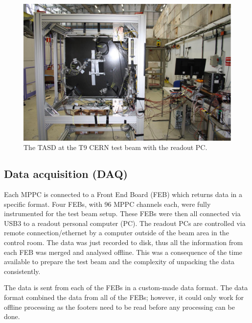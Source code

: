 \begin{figure}[h!]
\centering
\includegraphics[width=\textwidth]{figures/TASDinstrumented.jpeg}
\caption{The TASD at the T9 CERN test beam with the readout PC.}
\label{fig:TASDreal}
\end{figure}

\subsection{Data acquisition (DAQ)}
Each MPPC is connected to a Front End Board (FEB) which returns data in a specific format. Four FEBs, with 96 MPPC channels each, were fully instrumented for the test beam setup. These FEBs were then all connected via USB3 to a readout personal computer (PC). The readout PCs are controlled via remote connection/ethernet by a computer outside of the beam area in the control room. The data was just recorded to disk, thus all the information from each FEB was merged and analysed offline. This was a consequence of the time available to prepare the test beam and the complexity of unpacking the data consistently.


The data is sent from each of the FEBs in a custom-made data format. The data format combined the data from all of the FEBs; however, it could only work for offline processing as the footers need to be read before any processing can be done.

